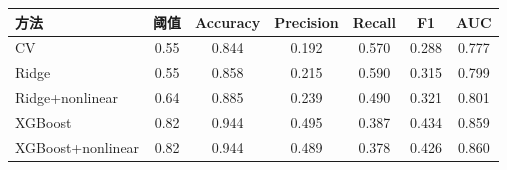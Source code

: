 \begin{tabular}{lcccccc}
\toprule
方法 & 阈值 & Accuracy & Precision & Recall & F1 & AUC \\ 
\midrule
CV & 0.55 & 0.844 & 0.192 & 0.570 & 0.288 & 0.777 \\ 
Ridge & 0.55 & 0.858 & 0.215 & 0.590 & 0.315 & 0.799 \\ 
Ridge+nonlinear & 0.64 & 0.885 & 0.239 & 0.490 & 0.321 & 0.801 \\ 
XGBoost & 0.82 & 0.944 & 0.495 & 0.387 & 0.434 & 0.859 \\ 
XGBoost+nonlinear & 0.82 & 0.944 & 0.489 & 0.378 & 0.426 & 0.860 \\ 
\bottomrule
\end{tabular}
